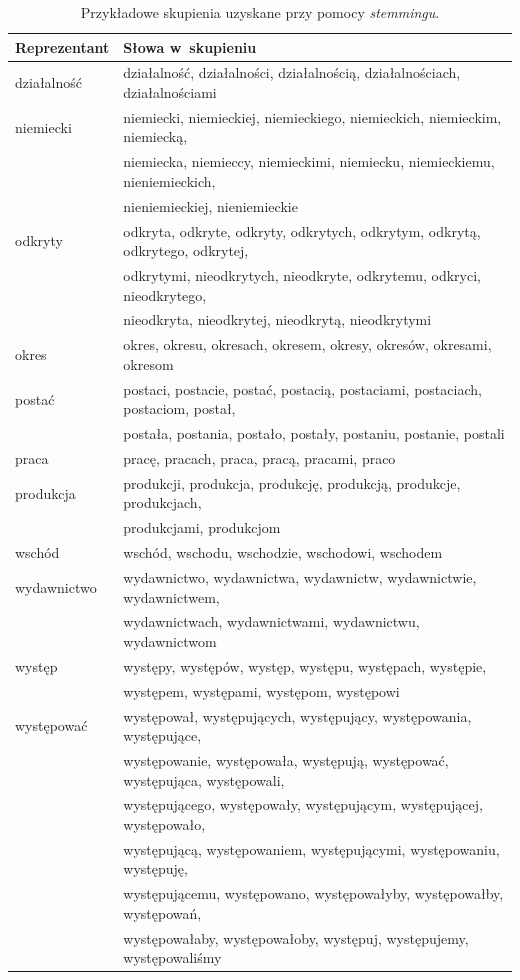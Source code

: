 \documentclass{praca1}
\begin{document}
\begin{table}[!h]
\centering
\caption{Przykładowe skupienia uzyskane przy pomocy \emph{stemmingu}.}
\begin{tabular}{|l|l|}
  \hline
Reprezentant & Słowa w~skupieniu \\ \hline
  \hline
działalność & działalność, działalności, działalnością, działalnościach, działalnościami \\ 
   \hline
niemiecki & niemiecki, niemieckiej, niemieckiego, niemieckich, niemieckim, niemiecką, \\ & niemiecka, niemieccy, niemieckimi, niemiecku, niemieckiemu, nieniemieckich, \\ & nieniemieckiej, nieniemieckie \\ 
   \hline
odkryty & odkryta, odkryte, odkryty, odkrytych, odkrytym, odkrytą, odkrytego, odkrytej, \\ & odkrytymi,  nieodkrytych, nieodkryte, odkrytemu, odkryci, nieodkrytego,  \\ & nieodkryta,  nieodkrytej, nieodkrytą, nieodkrytymi \\ 
   \hline
okres & okres, okresu, okresach, okresem, okresy, okresów, okresami, okresom \\ 
   \hline
postać & postaci, postacie, postać, postacią, postaciami, postaciach, postaciom, postał, \\ &  postała, postania, postało, postały, postaniu, postanie, postali \\ 
   \hline
praca & pracę, pracach, praca, pracą, pracami, praco \\ 
   \hline
produkcja & produkcji, produkcja, produkcję, produkcją, produkcje, produkcjach, \\ &  produkcjami, produkcjom \\ 
   \hline
wschód & wschód, wschodu, wschodzie, wschodowi, wschodem \\ 
   \hline
wydawnictwo & wydawnictwo, wydawnictwa, wydawnictw, wydawnictwie, wydawnictwem,\\ &  wydawnictwach, wydawnictwami, wydawnictwu, wydawnictwom \\ 
   \hline
występ & występy, występów, występ, występu, występach, występie, \\ & występem, występami, występom, występowi \\ 
   \hline
występować & występował, występujących, występujący, występowania, występujące, \\ &  występowanie, występowała, występują, występować, występująca, występowali, \\ &  występującego, występowały, występującym, występującej, występowało,\\ &  występującą, występowaniem, występującymi, występowaniu, występuję, \\ & występującemu, występowano, występowałyby, występowałby, występowań, \\ & występowałaby, występowałoby, występuj, występujemy, występowaliśmy \\  
   \hline
\end{tabular}
\label{tab:003}
\end{table}
\end{document}
